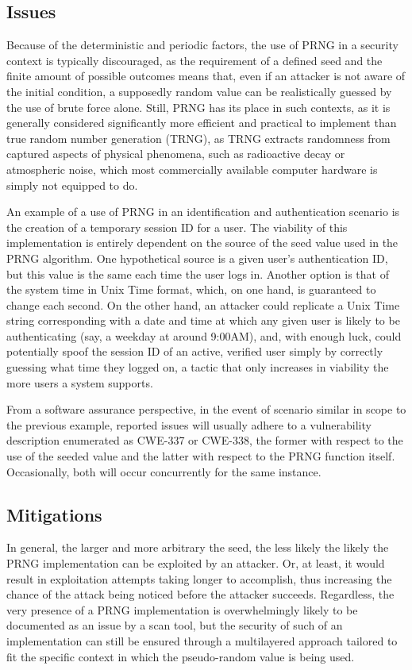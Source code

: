 \subsection{Issues}
Because of the deterministic and periodic factors, the use of PRNG in a security context is typically discouraged, as the requirement of a defined seed and the finite amount of possible outcomes means that, even if an attacker is not aware of the initial condition, a supposedly random value can be realistically guessed by the use of brute force alone. Still, PRNG has its place in such contexts, as it is generally considered significantly more efficient and practical to implement than true random number generation (TRNG), as TRNG extracts randomness from captured aspects of physical phenomena, such as radioactive decay or atmospheric noise, which most commercially available computer hardware is simply not equipped to do.

An example of a use of PRNG in an identification and authentication scenario is the creation of a temporary session ID for a user. The viability of this implementation is entirely dependent on the source of the seed value used in the PRNG algorithm. One hypothetical source is a given user’s authentication ID, but this value is the same each time the user logs in. Another option is that of the system time in Unix Time format, which, on one hand, is guaranteed to change each second. On the other hand, an attacker could replicate a Unix Time string corresponding with a date and time at which any given user is likely to be authenticating (say, a weekday at around 9:00\textsc{AM}), and, with enough luck, could potentially spoof the session ID of an active, verified user simply by correctly guessing what time they logged on, a tactic that only increases in viability the more users a system supports.

From a software assurance perspective, in the event of scenario similar in scope to the previous example, reported issues will usually adhere to a vulnerability description enumerated as CWE-337 or CWE-338,\autocites{20210517:cwe-337}{20210517:cwe-338} the former with respect to the use of the seeded value and the latter with respect to the PRNG function itself. Occasionally, both will occur concurrently for the same instance.


\subsection{Mitigations}
In general, the larger and more arbitrary the seed, the less likely the likely the PRNG implementation can be exploited by an attacker. Or, at least, it would result in exploitation attempts taking longer to accomplish, thus increasing the chance of the attack being noticed before the attacker succeeds. Regardless, the very presence of a PRNG implementation is overwhelmingly likely to be documented as an issue by a scan tool, but the security of such of an implementation can still be ensured through a multilayered approach tailored to fit the specific context in which the pseudo-random value is being used.

